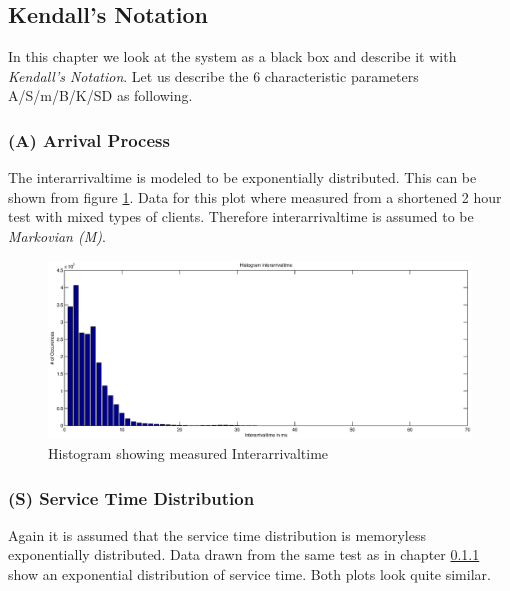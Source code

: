 \documentclass[a4paper]{article}
\begin{document}



\subsection{Kendall's Notation}
In this chapter we look at the system as a black box and describe it with \textit{Kendall's Notation}. Let us describe the 6 characteristic parameters A/S/m/B/K/SD as following.

\subsubsection{(A) Arrival Process}
\label{subsub:ArrivalProcess}

The interarrivaltime is modeled to be exponentially distributed. This can be shown from figure \ref{fig:interarrivaltime}. Data for this plot where measured from a shortened 2 hour test with mixed types of clients. Therefore interarrivaltime is assumed to be \textit{Markovian (M)}.



\begin{figure}[H]
	\begin{center}
    \includegraphics[scale=0.6]{../plots-ms2-mg/interarrivaltime.eps}
  \end{center}
  \caption{Histogram showing measured Interarrivaltime}
  \label{fig:interarrivaltime}
\end{figure}



\subsubsection{(S) Service Time Distribution }

Again it is assumed that the service time distribution is memoryless exponentially distributed. Data drawn from the same test as in chapter \ref{subsub:ArrivalProcess} show an exponential distribution of service time. Both plots look quite similar.
\end{document}
